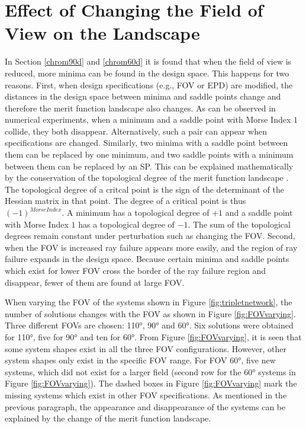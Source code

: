 \section{Effect of Changing the Field of View on the Landscape}
In Section \ref{chrom90d} and \ref{chrom60d} it is found that when the field of view is reduced, more minima can be found in the design space. This happens for two reasons. First, when design specifications (e.g., FOV or EPD) are modified, the distances in the design space between minima and saddle points change
and therefore the merit function landscape also changes. As can be observed in numerical experiments, when a minimum and a saddle point with Morse Index $1$ collide, they both disappear. Alternatively, such a pair can appear when specifications are changed. Similarly, two minima with a saddle point between them can be replaced by one minimum, and two saddle points with a minimum between them can be replaced by an SP. This can be explained mathematically by the conservation of the topological degree of the merit function landscape \cite{vanTurnhoutThesis2009} \cite{KoornwinderTopologicaldegree}. The topological degree of a critcal point is the sign of the determinant of the Hessian matrix in that point. The degree of a critical point is thus $(-1)^{Morse Index}$. A minimum has a topological degree of $+1$ and a saddle point with Morse Index $1$ has a topological degree of $-1$. The sum of the topological degrees remain constant under perturbation such as changing the FOV. Second, when the FOV is increased ray failure appears more easily, and the region of ray failure expands in the design space. Because certain minima and saddle points which exist for lower FOV cross the border of the ray failure region and disappear, fewer of them are found at large FOV.

 When varying the FOV of the systems shown in Figure \ref{fig:tripletnetwork}, the number of solutions changes with the FOV as shown in Figure \ref{fig:FOVvarying}. Three different FOVs are chosen: 110°, 90° and 60°. Six solutions were obtained for 110°, five for 90° and ten for 60°. From Figure \ref{fig:FOVvarying}, it is seen that some system shapes exist in all the three FOV configurations. However, other system shapes only exist in the specific FOV range.
For FOV 60°, five new systems, which did not exist for a larger field (second row for the 60° systems in Figure \ref{fig:FOVvarying}). The dashed boxes in Figure \ref{fig:FOVvarying} mark the missing systems which exist in other FOV specifications. As mentioned in the previous paragraph, the appearance and disappearance of the systems can be explained by the change of the merit function landscape. 

